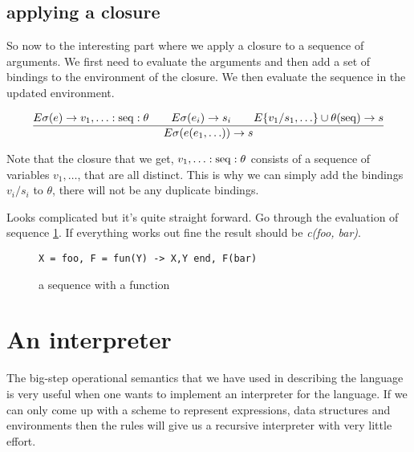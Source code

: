 \documentclass[a4paper,11pt]{article}
\begin{document}
\subsection{applying a closure}

So now to the interesting part where we apply a closure to a sequence
of arguments. We first need to evaluate the arguments and then add a
set of bindings to the environment of the closure. We then evaluate
the sequence in the updated environment.

$$\frac{E\sigma(e) \rightarrow v_1, \ldots:{\rm seq}:\theta \qquad E\sigma(e_i) \rightarrow s_i \qquad E\{v_1/s_1, \ldots\}\cup\theta({\rm seq}) \rightarrow s}{
E\sigma(e(e_1, \ldots)) \rightarrow s}$$ 

Note that the closure that we get, $v_1, \ldots:{\rm seq}:\theta$
consists of a sequence of variables $v_1, \ldots$, that are all
distinct. This is why we can simply add the bindings
$v_i/s_i$ to $\theta$, there will not be any duplicate bindings.

Looks complicated but it's quite straight forward. Go through the
evaluation of sequence \ref{fig:seq2}. If everything works out fine
the result should be {\em c(foo, bar)}.

\begin{figure}[ht]
\center
{\tt X = foo, F = fun(Y) -> {X,Y} end,  F(bar)}
\caption{a sequence with a function}
\label{fig:seq2}
\end{figure}

\section{An interpreter}

The big-step operational semantics that we have used in describing the
language is very useful when one wants to implement an interpreter
for the language. If we can only come up with a scheme to represent
expressions, data structures and environments then the rules will give
us a recursive interpreter with very little effort.
\end{document}
